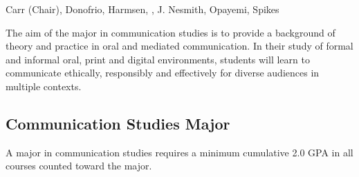 \documentclass[
  letterpaper,
]{scrbook}
\begin{document}
Carr (Chair), Donofrio, Harmsen, , J. Nesmith, Opayemi, Spikes

The aim of the major in communication studies is to provide a background
of theory and practice in oral and mediated communication. In their
study of formal and informal oral, print and digital environments,
students will learn to communicate ethically, responsibly and
effectively for diverse audiences in multiple contexts.

\subsection{Communication Studies
Major}\label{communication-studies-major}

A major in communication studies requires a minimum cumulative 2.0 GPA
in all courses counted toward the major.
\end{document}
